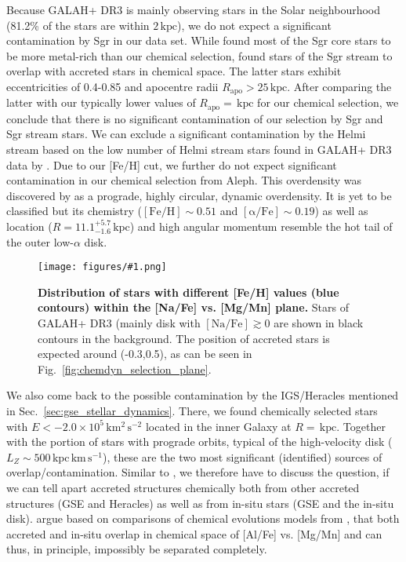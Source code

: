 \documentclass[fleqn,usenatbib]{mnras}
\newcommand{\kpc}{\,\mathrm{kpc}}	%
\newcommand{\kpckms}{\,\mathrm{kpc\,km\,s^{-1}}}	%
\newcommand{\kmkmss}{\,\mathrm{km^2\,s^{-2}}}	%
\newcommand{\codeicon}{{\faCloudDownload}}
\newcommand{\codelink}[1]{\href{https://github.com/svenbuder/buder_galah_accreted_chemistry/tree/main/figures/#1.ipynb}{\codeicon}\,\,}
\newcommand{\oscaption}[2]{\caption{#2 \codelink{#1}}}
\newcommand{\figurecolumnwidth}[3]{\begin{figure} \centering \texttt{[image: figures/\#1.png]}\oscaption{#2}{#3}\label{fig:#1} \end{figure}}
\begin{document}
Because GALAH+ DR3 is mainly observing stars in the Solar neighbourhood (81.2\% of the stars are within $2\kpc$), we do not expect a significant contamination by Sgr in our data set. While \citet{Hasselquist2017} found most of the Sgr core stars to be more metal-rich than our chemical selection, \citet{Hasselquist2019} found stars of the Sgr stream to overlap with accreted stars in chemical space. The latter stars exhibit eccentricities of 0.4-0.85 and apocentre radii $R_\text{apo} > 25\kpc$. After comparing the latter with our typically lower values of $R_\text{apo} = $$\kpc$ for our chemical selection, we conclude that there is no significant contamination of our selection by Sgr and Sgr stream stars. We can exclude a significant contamination by the Helmi stream based on the low number of Helmi stream stars found in GALAH+ DR3 data by \citet{Limberg2021}. Due to our [Fe/H] cut, we further do not expect significant contamination in our chemical selection from Aleph. This overdensity was discovered by \citet{Naidu2020} as a prograde, highly circular, dynamic overdensity. It is yet to be classified but its chemistry ($\mathrm{[Fe/H]} \sim 0.51$ and $\mathrm{[\alpha/Fe]} \sim 0.19$) as well as location ($R = 11.1_{-1.6}^{+5.7}\kpc$) and high angular momentum resemble the hot tail of the outer low-$\alpha$ disk.

\figurecolumnwidth{NaFe_MgMn_FeH_bins}{chronochemodynamic_comparison}{
\textbf{Distribution of stars with different [Fe/H] values (blue contours) within the [Na/Fe] vs. [Mg/Mn] plane.} Stars of GALAH+ DR3 (mainly disk with $\mathrm{[Na/Fe]} \gtrsim 0$ are shown in black contours in the background. The position of accreted stars is expected around (-0.3,0.5), as can be seen in Fig.~\ref{fig:chemdyn_selection_plane}.
}

We also come back to the possible contamination by the IGS/Heracles \citep{Horta2021} mentioned in Sec.~\ref{sec:gse_stellar_dynamics}. There, we found  chemically selected stars with $E < -2.0 \times 10^5 \kmkmss$ located in the inner Galaxy at $R = $$ \kpc$. Together with the portion of  stars with prograde orbits, typical of the high-velocity disk ($L_Z \sim 500\kpckms$), these are the two most significant (identified) sources of overlap/contamination. Similar to \citet{Horta2021}, we therefore have to discuss the question, if we can tell apart accreted structures chemically both from other accreted structures (GSE and Heracles) as well as from in-situ stars (GSE and the in-situ disk). \citet{Horta2021} argue based on comparisons of chemical evolutions models from \citet{Andrews2017}, that both accreted and in-situ overlap in chemical space of [Al/Fe] vs. [Mg/Mn] and can thus, in principle, impossibly be separated completely.
\end{document}
